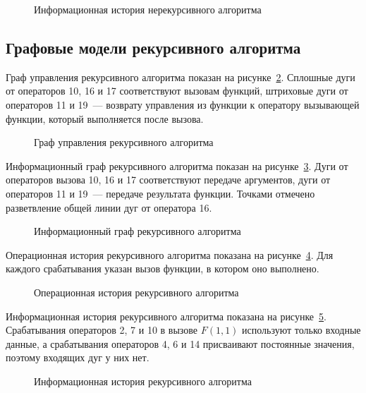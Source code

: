 \begin{figure}[H]
    \centering
    \caption{Информационная история нерекурсивного алгоритма}
    \label{fig:iter-info-history}
\end{figure}

\subsection{Графовые модели рекурсивного алгоритма}

Граф управления рекурсивного алгоритма показан на рисунке~\ref{fig:rec-control}.
Сплошные дуги от операторов 10, 16 и 17 соответствуют вызовам функций,
штриховые дуги от операторов 11 и 19~--- возврату управления из функции
к оператору вызывающей функции, который выполняется после вызова.

\begin{figure}[H]
    \centering
    \caption{Граф управления рекурсивного алгоритма}
    \label{fig:rec-control}
\end{figure}

Информационный граф рекурсивного алгоритма показан на
рисунке~\ref{fig:rec-info}. Дуги от операторов вызова 10, 16 и 17 соответствуют
передаче аргументов, дуги от операторов 11 и 19~--- передаче результата
функции. Точками отмечено разветвление общей линии дуг от оператора 16.

\begin{figure}[H]
    \centering
    \caption{Информационный граф рекурсивного алгоритма}
    \label{fig:rec-info}
\end{figure}

Операционная история рекурсивного алгоритма показана на
рисунке~\ref{fig:rec-op-history}. Для каждого срабатывания указан вызов
функции, в котором оно выполнено.

\begin{figure}[H]
    \centering
    \caption{Операционная история рекурсивного алгоритма}
    \label{fig:rec-op-history}
\end{figure}

Информационная история рекурсивного алгоритма показана на
рисунке~\ref{fig:rec-info-history}. Срабатывания операторов 2, 7 и 10 в вызове
$F(1,1)$ используют только входные данные, а срабатывания операторов 4, 6
и 14 присваивают постоянные значения, поэтому входящих дуг у них нет.

\begin{figure}[H]
    \centering
    \caption{Информационная история рекурсивного алгоритма}
    \label{fig:rec-info-history}
\end{figure}

